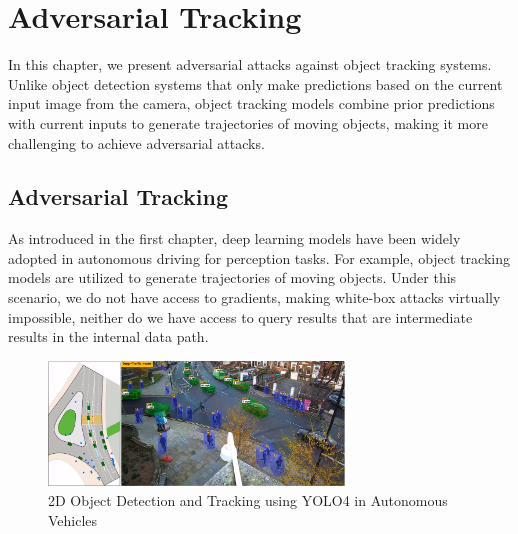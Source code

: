 \chapter{Adversarial Tracking}
\label{chpt:tracking}


In this chapter, we present adversarial attacks against object tracking systems. Unlike object detection systems that only make predictions based on the current input image from the camera, object tracking models combine prior predictions with current inputs to generate trajectories of moving objects, making it more challenging to achieve adversarial attacks.

\section{Adversarial Tracking}
\label{sec:adv_track}

As introduced in the first chapter, deep learning models have been widely adopted in autonomous driving for perception tasks. For example, object tracking models are utilized to generate trajectories of moving objects. Under this scenario, we do not have access to gradients, making white-box attacks virtually impossible, neither do we have access to query results that are intermediate results in the internal data path.

\begin{figure}[b]
\centering
\includegraphics[width=0.7\textwidth]{figures/chapter_4/tracking.jpg}
\caption{2D Object Detection and Tracking using YOLO4 in Autonomous Vehicles}
\label{fig.tracking}
\end{figure}


